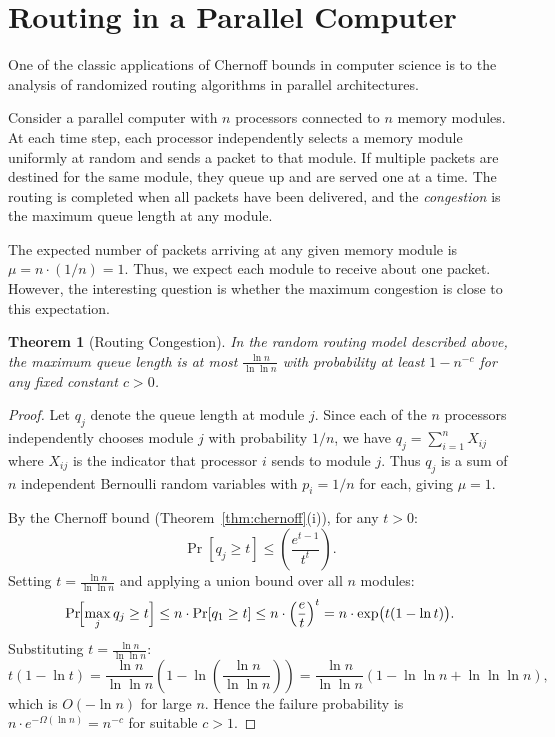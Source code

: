 \documentclass[twoside,12pt]{book}
\theoremstyle{plain}
\newtheorem{theorem}{Theorem}[chapter]
\theoremstyle{definition}
\theoremstyle{remark}
\begin{document}
\section{Routing in a Parallel Computer}
\label{sec:routing}

One of the classic applications of Chernoff bounds in computer science is
to the analysis of randomized routing algorithms in parallel architectures.

Consider a parallel computer with $n$ processors connected to $n$ memory
modules. At each time step, each processor independently selects a memory
module uniformly at random and sends a packet to that module. If multiple
packets are destined for the same module, they queue up and are served
one at a time. The routing is completed when all packets have been
delivered, and the \emph{congestion} is the maximum queue length at any
module.

The expected number of packets arriving at any given memory module is
$\mu = n \cdot (1/n) = 1$. Thus, we expect each module to receive about
one packet. However, the interesting question is whether the maximum
congestion is close to this expectation.

\begin{theorem}[Routing Congestion]
\label{thm:routing}
In the random routing model described above, the maximum queue length is
at most $\frac{\ln n}{\ln \ln n}$ with probability at least $1 - n^{-c}$
for any fixed constant $c > 0$.
\end{theorem}

\begin{proof}
Let $q_j$ denote the queue length at module $j$. Since each of the $n$
processors independently chooses module $j$ with probability $1/n$, we
have $q_j = \sum_{i=1}^{n} X_{ij}$ where $X_{ij}$ is the indicator
that processor $i$ sends to module $j$. Thus $q_j$ is a sum of $n$
independent Bernoulli random variables with $p_i = 1/n$ for each, giving
$\mu = 1$.

By the Chernoff bound (Theorem~\ref{thm:chernoff}(i)), for any $t > 0$:
\[
\Pr[q_j \geq t] \leq \left(\frac{e^{t-1}}{t^t}\right).
\]
Setting $t = \frac{\ln n}{\ln \ln n}$ and applying a union bound over
all $n$ modules:
\[
\Pr\!\Bigl[\max_j q_j \geq t\Bigr]
\leq n \cdot \Pr[q_1 \geq t]
\leq n \cdot \left(\frac{e}{t}\right)^t
= n \cdot \exp\bigl(t(1 - \ln t)\bigr).
\]
Substituting $t = \frac{\ln n}{\ln \ln n}$:
\[
t(1 - \ln t) = \frac{\ln n}{\ln\ln n}
\left(1 - \ln\!\left(\frac{\ln n}{\ln\ln n}\right)\right)
= \frac{\ln n}{\ln\ln n}\left(1 - \ln\ln n + \ln\ln\ln n\right),
\]
which is $O(-\ln n)$ for large $n$. Hence the failure probability is
$n \cdot e^{-\Omega(\ln n)} = n^{-c}$ for suitable $c > 1$.
\end{proof}
\end{document}
